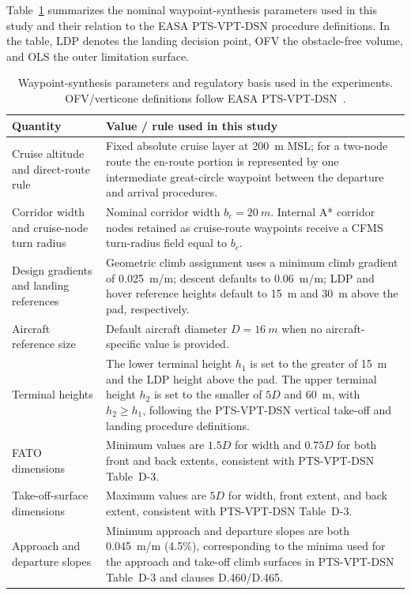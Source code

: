 Table~\ref{tab:waypoint_params} summarizes the nominal waypoint-synthesis parameters used in this study and their relation to the EASA PTS-VPT-DSN procedure definitions. In the table, LDP denotes the landing decision point, OFV the obstacle-free volume, and OLS the outer limitation surface.

\begin{table}[H]
    \centering
    \caption{Waypoint-synthesis parameters and regulatory basis used in the experiments. OFV/verticone definitions follow EASA PTS-VPT-DSN~\cite{easa2022_pts_vpt_dsn}.}
    \label{tab:waypoint_params}
    \small
    \begin{tabularx}{\textwidth}{lX}
        \toprule
        Quantity & Value / rule used in this study \\
        \midrule
        Cruise altitude and direct-route rule & Fixed absolute cruise layer at \SI{200}{m} MSL; for a two-node route the en-route portion is represented by one intermediate great-circle waypoint between the departure and arrival procedures. \\
        Corridor width and cruise-node turn radius & Nominal corridor width \(b_c=\SI{20}{m}\). Internal A* corridor nodes retained as cruise-route waypoints receive a CFMS turn-radius field equal to \(b_c\). \\
        Design gradients and landing references & Geometric climb assignment uses a minimum climb gradient of 0.025~m/m; descent defaults to 0.06~m/m; LDP and hover reference heights default to \SI{15}{m} and \SI{30}{m} above the pad, respectively. \\
        Aircraft reference size & Default aircraft diameter \(D=\SI{16}{m}\) when no aircraft-specific value is provided. \\
        Terminal heights & The lower terminal height \(h_1\) is set to the greater of \SI{15}{m} and the LDP height above the pad. The upper terminal height \(h_2\) is set to the smaller of \(5D\) and \SI{60}{m}, with \(h_2 \ge h_1\), following the PTS-VPT-DSN vertical take-off and landing procedure definitions. \\
        FATO dimensions & Minimum values are \(1.5D\) for width and \(0.75D\) for both front and back extents, consistent with PTS-VPT-DSN Table~D-3. \\
        Take-off-surface dimensions & Maximum values are \(5D\) for width, front extent, and back extent, consistent with PTS-VPT-DSN Table~D-3. \\
        Approach and departure slopes & Minimum approach and departure slopes are both 0.045~m/m (4.5\%), corresponding to the minima used for the approach and take-off climb surfaces in PTS-VPT-DSN Table~D-3 and clauses D.460/D.465. \\

\end{tabularx}
\end{table}
